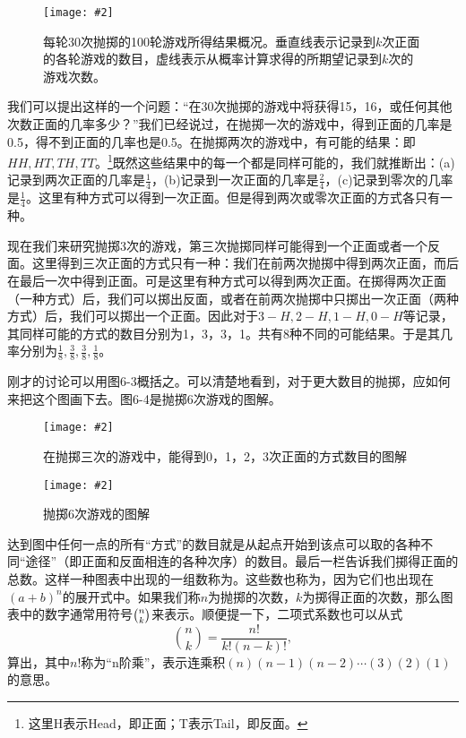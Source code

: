 \documentclass[12pt,oneside]{book}
\newenvironment{fig}[2][1]
{\begin{figure}[H]
\centering
\texttt{[image: \#2]}}
{\end{figure}}
\newenvironment{linefig}[2][1]
{\begin{figure}[H]
\centering
\texttt{[image: \#2]}}
{\end{figure}}
\begin{document}
\begin{linefig}{30次抛掷的100轮游戏所得结果概况}
\caption{\footnotesize 每轮30次抛掷的100轮游戏所得结果概况。垂直线表示记录到$k$次正面的各轮游戏的数目，虚线表示从概率计算求得的所期望记录到$k$次的游戏次数。}
\label{fig:30次抛掷的100轮游戏所得结果概况}
\end{linefig}

我们可以提出这样的一个问题：“在30次抛掷的游戏中将获得15，16，或任何其他次数正面的几率多少？”我们已经说过，在抛掷一次的游戏中，得到正面的几率是0.5，得不到正面的几率也是0.5。在抛掷两次的游戏中，有可能的结果：即$HH, HT, TH, TT$。\footnote{这里H表示Head，即正面；T表示Tail，即反面。}既然这些结果中的每一个都是同样可能的，我们就推断出：(a)记录到两次正面的几率是$\frac{1}{4}$，(b)记录到一次正面的几率是$\frac{2}{4}$，(c)记录到零次的几率是$\frac{1}{4}$。这里有种方式可以得到一次正面。但是得到两次或零次正面的方式各只有一种。

现在我们来研究抛掷3次的游戏，第三次抛掷同样可能得到一个正面或者一个反面。这里得到三次正面的方式只有一种：我们在前两次抛掷中得到两次正面，而后在最后一次中得到正面。可是这里有种方式可以得到两次正面。在掷得两次正面（一种方式）后，我们可以掷出反面，或者在前两次抛掷中只掷出一次正面（两种方式）后，我们可以掷出一个正面。因此对于$3-H, 2-H, 1-H, 0-H$等记录，其同样可能的方式的数目分别为1，3，3，1。共有8种不同的可能结果。于是其几率分别为$\frac{1}{8}, \frac{3}{8}, \frac{3}{8}, \frac{1}{8} $。

刚才的讨论可以用图6-3概括之。可以清楚地看到，对于更大数目的抛掷，应如何来把这个图画下去。图6-4是抛掷6次游戏的图解。
\begin{fig}{抛掷三次游戏的图解}
\caption{\footnotesize 在抛掷三次的游戏中，能得到0，1，2，3次正面的方式数目的图解}
\label{fig:抛掷三次游戏的图解}
\end{fig}

\begin{fig}{抛掷六次游戏的图解}
\caption{抛掷6次游戏的图解}
\label{fig:抛掷六次游戏的图解}
\end{fig}
达到图中任何一点的所有“方式”的数目就是从起点开始到该点可以取的各种不同“途径”（即正面和反面相连的各种次序）的数目。最后一栏告诉我们掷得正面的总数。这样一种图表中出现的一组数称为。这些数也称为，因为它们也出现在$(a+b)^n$的展开式中。如果我们称$n$为抛掷的次数，$k$为掷得正面的次数，那么图表中的数字通常用符号$\tbinom{n}{k}$来表示。顺便提一下，二项式系数也可以从式
\begin{equation}
\label{Eq:I:6:4}
\binom{n}{k}=\frac{n!}{k!(n-k)!},
\end{equation}
算出，其中$n!$称为“n阶乘”，表示连乘积$(n)(n-1)(n-2)\dotsm(3)(2)(1)$的意思。
\end{document}
